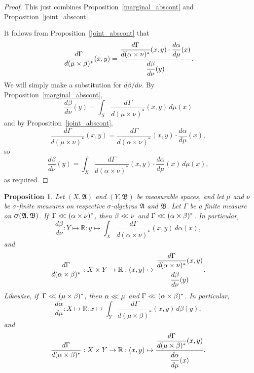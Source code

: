 \documentclass[
twoside=true,
paper=letter,
fontsize=9pt,
pagesize=auto,
leqno,
openany,
headsepline,
overfullrule,
]{scrbook}
\theoremstyle{plain}
\theoremstyle{plain}
\newtheorem{prop}[thm]{Proposition}
\theoremstyle{definition}
\theoremstyle{bfnoteitalic}
\theoremstyle{bfnoteroman}
\newcommand{\sigalg}[1]{\mathfrak{#1}}
\newcommand{\sagb}{\mathop{\hbox{\large{$\sigma$}}}\nolimits}
\newcommand{\textsigma}{\hbox{\large{$\sigma$}}\kern-1pt}
\newcommand{\R}{\mathbb{R}}
\newcommand{\sigmaalgebra}{\sigalg{A}}
\newcommand{\sigmaalgebraii}{\sigalg{B}}
\newcommand{\productsig}[2]{\sagb(#1,#2)}
\newcommand{\lilstrut}{\vphantom{\bigl(}}
\newcommand{\measurespace}{X}
\newcommand{\measurespaceii}{Y}
\newcommand{\mspaceelt}{x}
\newcommand{\mspaceeltii}{y}
\newcommand{\abscont}{\mathrel{< \kern-3.5pt <}}
\newcommand{\measure}{\mu}
\newcommand{\measmu}{\mu}
\newcommand{\measureii}{\nu}
\newcommand{\measnu}{\nu}
\newcommand{\joint}{\Gamma}%
\newcommand{\measonprod}{\Gamma}%
\newcommand{\marginalone}{\alpha}%
\newcommand{\marginaltwo}{\beta}%
\begin{document}
\begin{proof}
This just combines Proposition~\ref{marginal_abscont} and Proposition~\ref{joint_abscont}.

It follows from Proposition~\ref{joint_abscont} that
\[
\dfrac{d\joint}{d(\measmu\times\marginaltwo)^*}(\mspaceelt,\mspaceeltii)
=
\dfrac{
\dfrac{d\joint}{d(\marginalone\times\measnu)^*}(\mspaceelt,\mspaceeltii)
\cdot
\dfrac{d\marginalone}{d\measmu}(\mspaceelt)
}
{
\dfrac{d \marginaltwo\lilstrut}
{d\measnu}(\mspaceeltii)
}.
\]
We will simply make a substitution for
$d\marginaltwo / d\measnu$.
By Proposition~\ref{marginal_abscont},
\[
\frac{d \marginaltwo}
{d\measnu}(\mspaceeltii)
=
\int_{\measurespace}
\frac{d\joint}{d(\measmu\times\measnu)^*}
(\mspaceelt,\mspaceeltii)
\,d\measmu(\mspaceelt)
\]
and by Proposition~\ref{joint_abscont},
\[
\frac{d\joint}{d(\measmu\times\measnu)^*}
(\mspaceelt,\mspaceeltii)
=
\dfrac{d\joint}{d(\marginalone\times\measnu)^*}(\mspaceelt,\mspaceeltii)
\cdot
\dfrac{d\marginalone}{d\measmu}(\mspaceelt),
\]
so
\[
\frac{d \marginaltwo}
{d\measnu}(\mspaceeltii)
=
\displaystyle\int_\measurespace
\dfrac{d\joint}{d(\marginalone\times\measnu)^*}(\mspaceelt,\mspaceeltii)
\cdot
\dfrac{d\marginalone}{d\measmu}(\mspaceelt)\,
d\measmu(\mspaceelt),
\]
as required.
\end{proof}




\begin{prop}\label{mixed_implies_marginal}
Let
$(\measurespace, \sigmaalgebra)$
and
$(\measurespaceii, \sigmaalgebraii)$
be measurable spaces, and let $\measure$ and $\measureii$
be \textsigma-finite measures on  respective \textsigma-algebras
$\sigmaalgebra$ and $\sigmaalgebraii$.
Let $\measonprod$ be a finite measure on
$\productsig{\sigmaalgebra}{\sigmaalgebraii}$.
If\,
$\measonprod \abscont (\marginalone\times\measnu)^*$, then
$\marginaltwo\abscont\measnu$ and
$\measonprod\abscont(\marginalone\times\marginaltwo)^*$. In particular,
\[
\frac{d\marginaltwo}{d\measnu}
: \measurespaceii \mapsto\R
:\mspaceeltii\mapsto
\int_\measurespace
\dfrac{d\measonprod}{d(\marginalone\times\measnu)^*}(\mspaceelt,\mspaceeltii)
\, d\marginalone(\mspaceelt),
\]
and
\[
\frac{d\measonprod}{d(\marginalone\times\marginaltwo)^*}
: \measurespace\times\measurespaceii
\to \R
: (\mspaceelt,\mspaceeltii)\mapsto
\frac{\dfrac{d\measonprod}{d(\marginalone\times\measnu)^*}
(\mspaceelt,\mspaceeltii)}
{\dfrac{d\marginaltwo\lilstrut}{d\measnu}(\mspaceeltii)}.
\]
Likewise,
if\,
$\measonprod \abscont (\measmu\times\marginaltwo)^*$, then
$\marginalone\abscont\measmu$ and
$\measonprod\abscont(\marginalone\times\marginaltwo)^*$. In particular,
\[
\frac{d\marginalone}{d\measmu}
: \measurespace \mapsto\R
:\mspaceelt\mapsto
\int_\measurespaceii
\dfrac{d\measonprod}{d(\measmu\times\marginaltwo)^*}(\mspaceelt,\mspaceeltii)
\, d\marginaltwo(\mspaceeltii),
\]
and
\[
\frac{d\measonprod}{d(\marginalone\times\marginaltwo)^*}
: \measurespace\times\measurespaceii
\to \R
: (\mspaceelt,\mspaceeltii)\mapsto
\frac{\dfrac{d\joint}{d(\measmu\times\marginaltwo)^*}
(\mspaceelt,\mspaceeltii)}
{\dfrac{d\marginalone\lilstrut}{d\measmu}(\mspaceelt)}.
\]
\end{prop}
\end{document}
